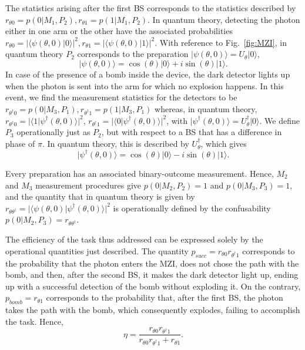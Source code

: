 \documentclass[letterpaper,onecolumn,12pt,accepted=2024-01-17]{article}
\begin{document}
The statistics arising after the first BS corresponds to the statistics described by $r_{\theta 0} = p(0 \vert M_1,P_2), r_{\theta 1}=p(1\vert M_1,P_2)$. In quantum theory, { detecting the photon either in one arm or the other have the  associated probabilities} $r_{\theta 0}= \vert \langle \psi(\theta,0) \vert 0 \rangle \vert^2, r_{\theta 1} = \vert \langle \psi (\theta,0) \vert 1 \rangle \vert^2$. With reference to Fig.~\ref{fig:MZI}, in quantum theory $P_2$ corresponds to the preparation $\vert \psi(\theta,0)\rangle = U_\theta \vert 0 \rangle$, 
\begin{equation}\label{eq: preparation state bomb}
    \vert \psi(\theta,0)\rangle = \cos(\theta)\vert 0 \rangle + i\sin(\theta)\vert 1 \rangle. 
\end{equation}
In case of the presence of a bomb inside the device, the dark detector lights up when the photon is sent into the arm for which no explosion happens. In this event, we find the measurement statistics for the detectors to be $r_{\theta^\dagger 0} = p(0\vert M_3, P_1),r_{\theta^\dagger 1} = p(1\vert M_3, P_1) $ whereas, in quantum theory, $r_{\theta^\dagger 0} = \vert \langle 1 \vert \psi^\dagger(\theta,0)\rangle \vert^2$, $r_{\theta^\dagger 1} = \vert \langle 0 \vert \psi^\dagger(\theta,0)\rangle \vert^2$, with $\vert \psi^\dagger(\theta,0) \rangle = U_\theta^\dagger \vert 0 \rangle $. We define $P_3$ operationally just as $P_2$, but with respect to a BS that has a difference in phase of $\pi$. In quantum theory, this is described by $U_\theta^\dagger$, which gives
\begin{equation}\label{eq: detection state}
    \vert \psi^\dagger(\theta,0) \rangle = \cos(\theta)\vert 0 \rangle - i\sin(\theta)\vert 1 \rangle.
\end{equation}

Every preparation has an associated binary-outcome measurement.  Hence, $M_2$ and $M_3$ measurement procedures give $p(0 \vert M_2, P_2) = 1$ and $p(0 \vert M_3, P_3) = 1$, and the quantity that in quantum theory is given by $r_{\theta \theta^\dagger} = \vert \langle \psi (\theta,0) \vert \psi^\dagger(\theta,0) \rangle \vert^2$ is operationally defined by the confusability $p(0 \vert M_2,P_3) = r_{\theta \theta^\dagger}$. 


The efficiency of the task thus addressed can be expressed solely by the operational quantities just described. The quantity $p_{succ} = r_{\theta 0}r_{\theta^\dagger 1}$ corresponds to the probability that the photon enters the MZI, does not chose the path with the bomb, and then, after the second BS, it makes the dark detector light up, ending up with a successful detection of the bomb without exploding it. On the contrary, $p_{bomb} = r_{\theta 1}$ corresponds to the probability that, after the first BS, the photon takes the path with the bomb, which consequently explodes, failing to accomplish the task. Hence,
\begin{equation}\label{eq: operational efficiency}
    \eta = \frac{r_{\theta 0}r_{\theta^\dagger 1}}{r_{\theta 0}r_{\theta^\dagger 1}+r_{\theta 1}}.
\end{equation}
\end{document}
